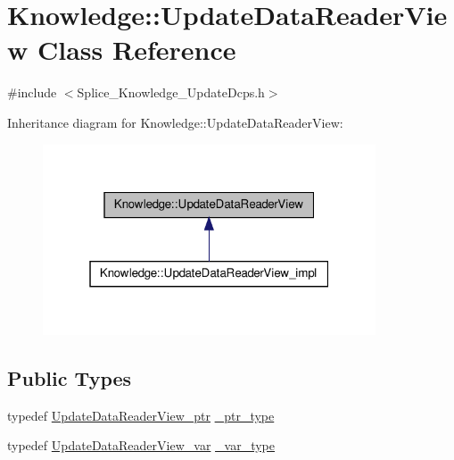 \hypertarget{classKnowledge_1_1UpdateDataReaderView}{
\section{Knowledge::UpdateDataReaderView Class Reference}
\label{dc/d54/classKnowledge_1_1UpdateDataReaderView}
}


{\ttfamily \#include $<$Splice\_\-Knowledge\_\-UpdateDcps.h$>$}



Inheritance diagram for Knowledge::UpdateDataReaderView:
\nopagebreak
\begin{figure}[H]
\begin{center}
\leavevmode
\includegraphics[width=280pt]{da/d73/classKnowledge_1_1UpdateDataReaderView__inherit__graph}
\end{center}
\end{figure}
\subsection*{Public Types}
\begin{DoxyCompactItemize}
\item 
typedef \hyperlink{classKnowledge_1_1UpdateDataReaderView}{UpdateDataReaderView\_\-ptr} \hyperlink{classKnowledge_1_1UpdateDataReaderView_a4c3a2a03673aca411627e9dbb1bf9dcf}{\_\-ptr\_\-type}
\item 
typedef \hyperlink{namespaceKnowledge_ad97d086c37b8c4370a3dbd0fa1f4b86a}{UpdateDataReaderView\_\-var} \hyperlink{classKnowledge_1_1UpdateDataReaderView_ae036155ce21cb7d4ce5659d67b0fb234}{\_\-var\_\-type}
\end{DoxyCompactItemize}
